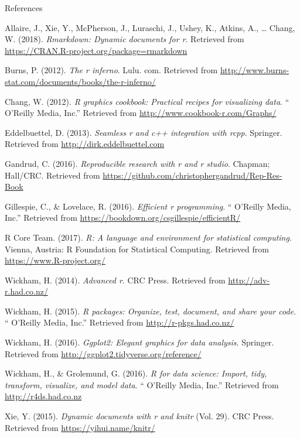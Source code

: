 \documentclass[10pt,ignorenonframetext,]{beamer}
\begin{document}
\begin{frame}{References}

\hypertarget{refs}{}
\hypertarget{ref-Rmarkdown}{}
Allaire, J., Xie, Y., McPherson, J., Luraschi, J., Ushey, K., Atkins,
A., \ldots{} Chang, W. (2018). \emph{Rmarkdown: Dynamic documents for
r}. Retrieved from \url{https://CRAN.R-project.org/package=rmarkdown}

\hypertarget{ref-Rinferno}{}
Burns, P. (2012). \emph{The r inferno}. Lulu. com. Retrieved from
\url{http://www.burns-stat.com/documents/books/the-r-inferno/}

\hypertarget{ref-cookbookR}{}
Chang, W. (2012). \emph{R graphics cookbook: Practical recipes for
visualizing data}. `` O'Reilly Media, Inc.'' Retrieved from
\url{http://www.cookbook-r.com/Graphs/}

\hypertarget{ref-rcpp}{}
Eddelbuettel, D. (2013). \emph{Seamless r and c++ integration with
rcpp}. Springer. Retrieved from \url{http://dirk.eddelbuettel.com}

\hypertarget{ref-reproducibleR}{}
Gandrud, C. (2016). \emph{Reproducible research with r and r studio}.
Chapman; Hall/CRC. Retrieved from
\url{https://github.com/christophergandrud/Rep-Res-Book}

\hypertarget{ref-efficientR}{}
Gillespie, C., \& Lovelace, R. (2016). \emph{Efficient r programming}.
`` O'Reilly Media, Inc.'' Retrieved from
\url{https://bookdown.org/csgillespie/efficientR/}

\hypertarget{ref-Rbase}{}
R Core Team. (2017). \emph{R: A language and environment for statistical
computing}. Vienna, Austria: R Foundation for Statistical Computing.
Retrieved from \url{https://www.R-project.org/}

\hypertarget{ref-advr}{}
Wickham, H. (2014). \emph{Advanced r}. CRC Press. Retrieved from
\url{http://adv-r.had.co.nz/}

\hypertarget{ref-rpkg}{}
Wickham, H. (2015). \emph{R packages: Organize, test, document, and
share your code}. `` O'Reilly Media, Inc.'' Retrieved from
\url{http://r-pkgs.had.co.nz/}

\hypertarget{ref-ggplot2}{}
Wickham, H. (2016). \emph{Ggplot2: Elegant graphics for data analysis}.
Springer. Retrieved from \url{http://ggplot2.tidyverse.org/reference/}

\hypertarget{ref-r4ds}{}
Wickham, H., \& Grolemund, G. (2016). \emph{R for data science: Import,
tidy, transform, visualize, and model data}. `` O'Reilly Media, Inc.''
Retrieved from \url{http://r4ds.had.co.nz}

\hypertarget{ref-knitr}{}
Xie, Y. (2015). \emph{Dynamic documents with r and knitr} (Vol. 29). CRC
Press. Retrieved from \url{https://yihui.name/knitr/}

\end{frame}
\end{document}
